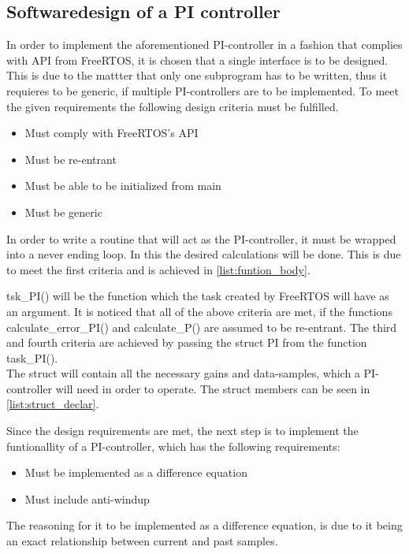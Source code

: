 \documentclass[../../../main]{subfiles}
\begin{document}
\subsection{Softwaredesign of a PI controller}
In order to implement the aforementioned PI-controller in a fashion that complies with API from FreeRTOS, it is chosen that a single interface is to be designed.
This is due to the mattter that only one subprogram has to be written, thus it requieres to be generic, if multiple PI-controllers are to be implemented.
To meet the given requirements the following design criteria must be fulfilled.

\begin{itemize}

  \item Must comply with FreeRTOS's API
  \item Must be re-entrant
  \item Must be able to be initialized from main
  \item Must be generic
\end{itemize}

In order to write a routine that will act as the PI-controller, it must be wrapped into a never ending loop.
In this the desired calculations will be done. This is due to meet the first criteria and is achieved in \ref{list:funtion_body}.





tsk\_PI() will be the function which the task created by FreeRTOS will have as an argument.
It is noticed that all of the above criteria are met, if the functions calculate\_error\_PI() and calculate\_P() are assumed to be re-entrant.
The third and fourth criteria are achieved by passing the struct PI from the function task\_PI().
\\

The struct will contain all the necessary gains and data-samples, which a PI-controller will need in order to operate.
The struct members can be seen in \ref{list:struct_declar}.


\newpage
Since the design requirements are met, the next step is to implement the funtionallity of a PI-controller, which has the following requirements:
\begin{itemize}
    \item Must be implemented as a difference equation
    \item Must include anti-windup
\end{itemize}
The reasoning for it to be implemented as a difference equation, is due to it being an exact relationship between current and past samples.
\end{document}
